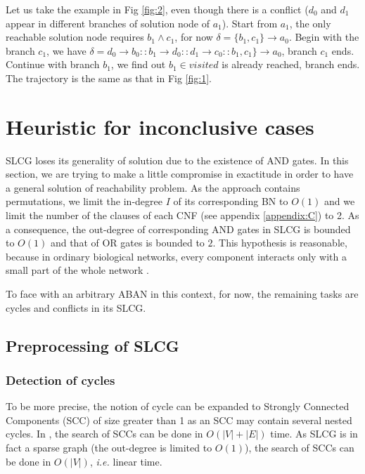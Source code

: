 \documentclass[runningheads]{llncs}
\newcommand{\acm}[3]{#1\rightarrow#2}
\begin{document}
Let us take the example in Fig \ref{fig:2}, even though there is a conflict ($d_0$ and $d_1$ appear in different branches of solution node of $a_1$). Start from $a_1$, the only reachable solution node requires $b_1\land c_1$, for now $\delta=\acm{\{b_1,c_1\}}{a_0}{a_1}$. Begin with the branch $c_1$, we have $\delta=\acm{d_0}{b_0}{b_1}::\acm{b_1}{d_0}{d_1}::\acm{d_1}{c_0}{c_1}::\acm{b_1,c_1\}}{a_0}{a_1}$, branch $c_1$ ends. Continue with branch $b_1$, we find out $b_1\in visited$ is already reached, branch ends. The trajectory is the same as that in Fig \ref{fig:1}.



\section{Heuristic for inconclusive cases}\label{sect:4}

SLCG loses its generality of solution due to the existence of AND gates. %
In this section, we are trying to make a little compromise in exactitude in order to have a general solution of reachability problem. %
As the approach contains permutations, we limit the in-degree $I$ of its corresponding BN to $O (1)$ and we limit the number of the clauses of each CNF (see appendix \ref{appendix:C}) to 2. As a consequence, the out-degree of corresponding AND gates in SLCG is bounded to $O (1)$ and that of OR gates is bounded to $2$. This hypothesis is reasonable, because in ordinary biological networks, every component interacts only with a small part of the whole network \cite{akutsu2007control}.

To face with an arbitrary ABAN in this context, for now, the remaining tasks are cycles and conflicts in its SLCG.
\subsection{Preprocessing of SLCG}\label{sectprecond}
\subsubsection{Detection of cycles}
To be more precise, the notion of cycle can be expanded to Strongly Connected Components (SCC) of size greater than 1 as an SCC may contain several nested cycles. In \cite{tarjan1972}, the search of SCCs can be done in $O (|V|+|E|)$ time. As SLCG is in fact a sparse graph (the out-degree is limited to $O (1)$), the search of SCCs can be done in $O (|V|)$, \textit{i.e.} linear time.
\end{document}
